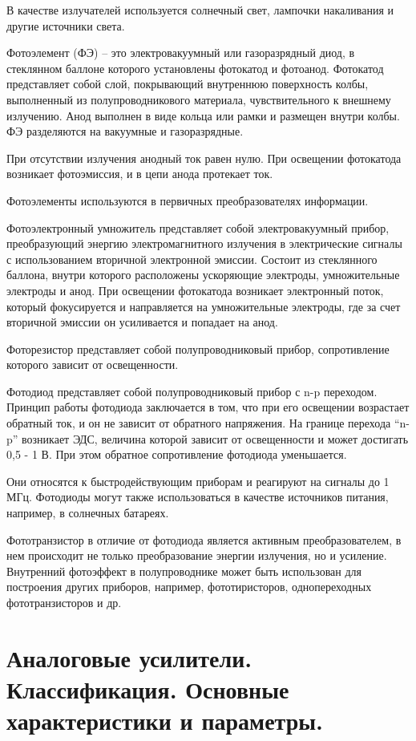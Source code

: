 \documentclass[unicode, 12pt, a4paper, oneside]{article}
\begin{document}
В качестве излучателей используется солнечный свет, лампочки накаливания и другие источники света.

Фотоэлемент (ФЭ) – это электровакуумный или газоразрядный диод, в стеклянном баллоне которого установлены фотокатод и фотоанод. Фотокатод представляет собой слой, покрывающий внутреннюю поверхность колбы, выполненный из полупроводникового материала, чувствительного к внешнему излучению. Анод выполнен в виде кольца или рамки и размещен внутри колбы. ФЭ разделяются на вакуумные и газоразрядные.

При отсутствии излучения анодный ток равен нулю. При освещении фотокатода возникает фотоэмиссия, и в цепи анода протекает ток.

Фотоэлементы используются в первичных преобразователях информации.

Фотоэлектронный умножитель представляет собой электровакуумный прибор, преобразующий энергию электромагнитного излучения в электрические сигналы с использованием вторичной электронной эмиссии. Состоит из стеклянного баллона, внутри которого расположены ускоряющие электроды, умножительные электроды и анод. При освещении фотокатода возникает электронный поток, который фокусируется и направляется на умножительные электроды, где за счет вторичной эмиссии он усиливается и попадает на анод.

Фоторезистор представляет собой полупроводниковый прибор, сопротивление которого зависит от освещенности.

Фотодиод представляет собой полупроводниковый прибор с n-p переходом. Принцип работы фотодиода заключается в том, что при его освещении возрастает обратный ток, и он не зависит от обратного напряжения. На границе перехода “n-p” возникает ЭДС, величина которой зависит от освещенности и может достигать 0,5 - 1 В. При этом обратное сопротивление фотодиода уменьшается.

Они относятся к быстродействующим приборам и реагируют на сигналы до 1 МГц. Фотодиоды могут также использоваться в качестве источников питания, например, в солнечных батареях.

Фототранзистор в отличие от фотодиода является активным преобразователем, в нем происходит не только преобразование энергии излучения, но и усиление.
Внутренний фотоэффект в полупроводнике может быть использован для построения других приборов, например, фототиристоров, однопереходных фототранзисторов и др.


\section{Аналоговые усилители. Классификация. Основные характеристики и параметры.}
\end{document}
